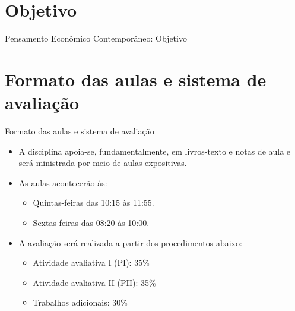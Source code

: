 \documentclass[10pt]{beamer}
\begin{document}
\section{Objetivo}
\begin{frame}{Pensamento Econômico Contemporâneo: Objetivo}
    \begin{center}
        \begin{minipage}{.8\textwidth}
        \end{minipage}
    \end{center}
\end{frame}

\section{Formato das aulas e sistema de avaliação}
\begin{frame}{Formato das aulas e sistema de avaliação}
    \begin{itemize}
        \item A disciplina apoia-se, fundamentalmente, em livros-texto e notas de aula e será ministrada por meio de aulas expositivas.\bigskip

        \item As aulas acontecerão às:\medskip
              \begin{itemize}
                  \item Quintas-feiras das 10:15 às 11:55.\medskip
                  \item Sextas-feiras das 08:20 às 10:00.\bigskip
              \end{itemize}

        \item A avaliação será realizada a partir dos procedimentos abaixo:\medskip
              \begin{itemize}
                  \item Atividade avaliativa I (PI): 35\%\medskip
                  \item Atividade avaliativa II (PII): 35\%\medskip                  
                  \item Trabalhos adicionais: 30\%
              \end{itemize}
    \end{itemize}
\end{frame}
\end{document}

